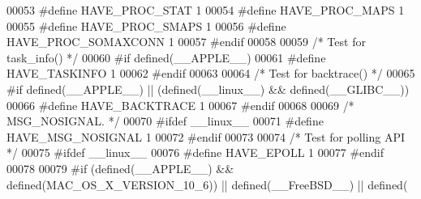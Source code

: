 \begin{DoxyCode}
00053 \textcolor{preprocessor}{#}\textcolor{preprocessor}{define} \textcolor{preprocessor}{HAVE\_PROC\_STAT} 1
00054 \textcolor{preprocessor}{#}\textcolor{preprocessor}{define} \textcolor{preprocessor}{HAVE\_PROC\_MAPS} 1
00055 \textcolor{preprocessor}{#}\textcolor{preprocessor}{define} \textcolor{preprocessor}{HAVE\_PROC\_SMAPS} 1
00056 \textcolor{preprocessor}{#}\textcolor{preprocessor}{define} \textcolor{preprocessor}{HAVE\_PROC\_SOMAXCONN} 1
00057 \textcolor{preprocessor}{#}\textcolor{preprocessor}{endif}
00058 
00059 \textcolor{comment}{/* Test for task\_info() */}
00060 \textcolor{preprocessor}{#}\textcolor{preprocessor}{if} \textcolor{preprocessor}{defined}\textcolor{preprocessor}{(}\textcolor{preprocessor}{\_\_APPLE\_\_}\textcolor{preprocessor}{)}
00061 \textcolor{preprocessor}{#}\textcolor{preprocessor}{define} \textcolor{preprocessor}{HAVE\_TASKINFO} 1
00062 \textcolor{preprocessor}{#}\textcolor{preprocessor}{endif}
00063 
00064 \textcolor{comment}{/* Test for backtrace() */}
00065 \textcolor{preprocessor}{#}\textcolor{preprocessor}{if} \textcolor{preprocessor}{defined}\textcolor{preprocessor}{(}\textcolor{preprocessor}{\_\_APPLE\_\_}\textcolor{preprocessor}{)} \textcolor{preprocessor}{||} \textcolor{preprocessor}{(}\textcolor{preprocessor}{defined}\textcolor{preprocessor}{(}\_\_linux\_\_\textcolor{preprocessor}{)} \textcolor{preprocessor}{&&} \textcolor{preprocessor}{defined}\textcolor{preprocessor}{(}\_\_GLIBC\_\_\textcolor{preprocessor}{)}\textcolor{preprocessor}{)}
00066 \textcolor{preprocessor}{#}\textcolor{preprocessor}{define} \textcolor{preprocessor}{HAVE\_BACKTRACE} 1
00067 \textcolor{preprocessor}{#}\textcolor{preprocessor}{endif}
00068 
00069 \textcolor{comment}{/* MSG\_NOSIGNAL. */}
00070 \textcolor{preprocessor}{#}\textcolor{preprocessor}{ifdef} \_\_linux\_\_
00071 \textcolor{preprocessor}{#}\textcolor{preprocessor}{define} \textcolor{preprocessor}{HAVE\_MSG\_NOSIGNAL} 1
00072 \textcolor{preprocessor}{#}\textcolor{preprocessor}{endif}
00073 
00074 \textcolor{comment}{/* Test for polling API */}
00075 \textcolor{preprocessor}{#}\textcolor{preprocessor}{ifdef} \_\_linux\_\_
00076 \textcolor{preprocessor}{#}\textcolor{preprocessor}{define} \textcolor{preprocessor}{HAVE\_EPOLL} 1
00077 \textcolor{preprocessor}{#}\textcolor{preprocessor}{endif}
00078 
00079 \textcolor{preprocessor}{#}\textcolor{preprocessor}{if} \textcolor{preprocessor}{(}\textcolor{preprocessor}{defined}\textcolor{preprocessor}{(}\textcolor{preprocessor}{\_\_APPLE\_\_}\textcolor{preprocessor}{)} \textcolor{preprocessor}{&&} \textcolor{preprocessor}{defined}\textcolor{preprocessor}{(}\textcolor{preprocessor}{MAC\_OS\_X\_VERSION\_10\_6}\textcolor{preprocessor}{)}\textcolor{preprocessor}{)} \textcolor{preprocessor}{||} \textcolor{preprocessor}{defined}\textcolor{preprocessor}{(}\textcolor{preprocessor}{\_\_FreeBSD\_\_}\textcolor{preprocessor}{)} \textcolor{preprocessor}{||} \textcolor{preprocessor}{defined}\textcolor{preprocessor}{(}\textcolor{preprocessor}{
}
\end{DoxyCode}
